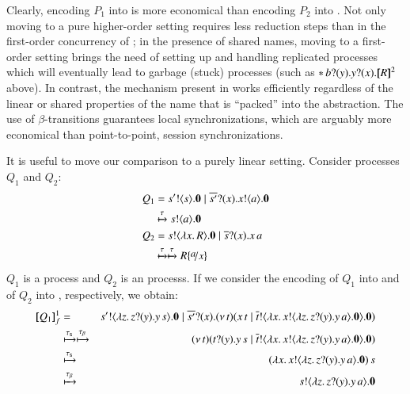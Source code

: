 \documentclass[preprint,11pt]{elsarticle}
\begin{document}
{%
Clearly, encoding $P_1$ into \HO is more economical than 
encoding $P_2$ into \sessp. Not only moving to a pure higher-order setting requires less reduction steps than in the first-order concurrency of \sessp; in the presence of shared names, moving to a first-order setting brings the need of setting up and handling replicated processes which will eventually lead to garbage (stuck) processes (such as $\ast\, b ? (y) . y ? (x) . [\!\![R]\!\!]^2$ above). In contrast, the mechanism present in \HO works efficiently regardless of the linear or shared properties of the name that is ``packed'' into the abstraction. 
The use of $\beta$-transitions guarantees local synchronizations, which are arguably more economical than point-to-point, session synchronizations.

It is useful to move our comparison 
to a purely linear setting. %
Consider processes $Q_1$ and $Q_2$:
\begin{align*}
	Q_1  & =  \bout{s'}{s} \inact \Par \binp{\dual{s'}}{x} \bout{x}{a} \inact
	\\
	& \hby{\tau}
	\bout{s}{a} \inact 
	\\
	Q_2 & =  \bout{s}{\abs{x}{R}} \inact \Par \binp{\dual{s}}{x} \appl{x}{a}
	\\
	& \hby{\tau}
	\hby{\tau}
	R \subst{a}{x}
\end{align*}
$Q_1$ is a \sessp process and $Q_2$ is an \HO processs.
If we consider the encoding of $Q_1$ into \HO and of $Q_2$ into \sessp, respectively, 
we obtain:
\begin{eqnarray*}
	\map{Q_1}_f^{1} & = & \bout{s'}{\abs{z}{\binp{z}{y} \appl{y}{s}}} \inact \Par \binp{\dual{s'}}{x} \newsp{t}{\appl{x}{t} \Par \bout{\dual{t}}{\abs{x}{\bout{x}{\abs{z}{\binp{z}{y} \appl{y}{a}}} \inact}} \inact}\\
	& \hby{\stau} \hby{\btau}& 
	\newsp{t}{\binp{t}{y} \appl{y}{s} \Par \bout{\dual{t}}{\abs{x}{\bout{x}{\abs{z}{\binp{z}{y} \appl{y}{a}}} \inact}} \inact}\\
	& \hby{\stau} & 
	\appl{(\abs{x}{\bout{x}{\abs{z}{\binp{z}{y} \appl{y}{a}}} \inact})}{s}
	\\
	& \hby{\btau} & 
	\bout{s}{\abs{z}{\binp{z}{y} \appl{y}{a}}} \inact \\

\end{eqnarray*}}
\end{document}
